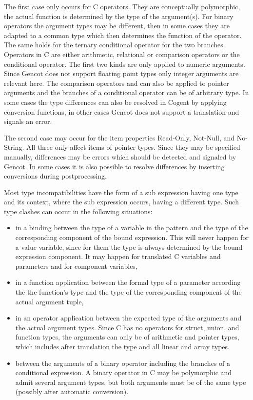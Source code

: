 The first case only occurs for C operators. They are conceptually polymorphic, the actual function is determined by the type
of the argument(s). For binary operators the argument types may be different, then in some cases they are adapted to a common
type which then determines the function of the operator. The same holds for the ternary conditional operator for the two
branches. Operators in C are either arithmetic, relational or comparison operators or the conditional operator. The first
two kinds are only applied to numeric arguments. Since Gencot does not support floating point types only integer arguments
are relevant here. The comparison operators \code{==} and \code{!=} can also be applied to pointer arguments and the branches
of a conditional operator can be of arbitrary type. In some cases the type differences can also be resolved in Cogent by
applying conversion functions, in other cases Gencot does not support a translation and signals an error.

The second case may occur for the item properties Read-Only, Not-Null, and No-String. All three only affect items of pointer
types. Since they may be specified manually, differences may be errors which should be detected and signaled by Gencot. In some
cases it is also possible to resolve differences by inserting conversions during postprocessing.

Most type incompatibilities have the form of a sub expression having one type and its context, where the sub expression occurs,
having a different type. Such type clashes can occur in the following situations:
\begin{itemize}
\item in a binding between the type of a variable in the pattern and the type of the corresponding component of the bound
expression. This will never happen for a value variable, since for them the type is always determined by the bound expression
component. It may happen for translated C variables and parameters and for component variables,
\item in a function application between the formal type of a parameter according the the function's type and the type of
the corresponding component of the actual argument tuple,
\item in an operator application between the expected type of the arguments and the actual argument types. Since C has no operators
for struct, union, and function types, the arguments can only be of arithmetic and pointer types, which includes after
translation the type  and all linear and array types.
\item between the arguments of a binary operator including the branches of a conditional expression. A binary operator in C
may be polymorphic and admit several argument types, but both arguments must be of the same type (possibly after automatic
conversion).
\end{itemize}

